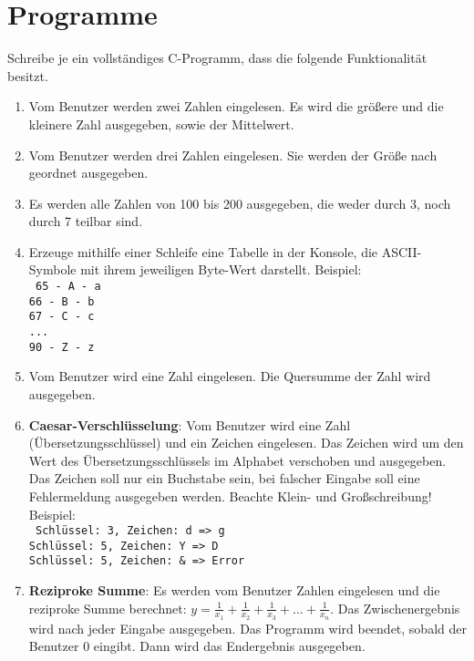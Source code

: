 \documentclass[]{scrartcl}
\begin{document}
\section{Programme}
Schreibe je ein vollständiges C-Programm, dass die folgende Funktionalität besitzt.
\begin{enumerate}[{1)}]
	\item Vom Benutzer werden zwei Zahlen eingelesen. Es wird die größere und die kleinere Zahl ausgegeben, sowie der Mittelwert.
	
	\item Vom Benutzer werden drei Zahlen eingelesen. Sie werden der Größe nach geordnet ausgegeben.
	
	\item Es werden alle Zahlen von 100 bis 200 ausgegeben, die weder durch 3, noch durch 7 teilbar sind.
	
	\item Erzeuge mithilfe einer Schleife eine Tabelle in der Konsole, die ASCII-Symbole mit ihrem jeweiligen Byte-Wert darstellt. Beispiel:\\
	\texttt{
		65 - A - a\\
		66 - B - b\\
		67 - C - c\\
		...\\
		90 - Z - z\\
	}

	\item Vom Benutzer wird eine Zahl eingelesen. Die Quersumme der Zahl wird ausgegeben.
	
	\item \textbf{Caesar-Verschlüsselung}: Vom Benutzer wird eine Zahl (Übersetzungsschlüssel) und ein Zeichen eingelesen. Das Zeichen wird um den Wert des Übersetzungsschlüssels im Alphabet verschoben und ausgegeben. Das Zeichen soll nur ein Buchstabe sein, bei falscher Eingabe soll eine Fehlermeldung ausgegeben werden. Beachte Klein- und Großschreibung! Beispiel:\\
	\texttt{
		Schlüssel: 3, Zeichen: d => g\\
		Schlüssel: 5, Zeichen: Y => D\\
		Schlüssel: 5, Zeichen: \& => Error
	}

	\item \textbf{Reziproke Summe}: Es werden vom Benutzer Zahlen eingelesen und die reziproke Summe berechnet: $y = \frac{1}{x_1} + \frac{1}{x_2} + \frac{1}{x_3} + \ldots + \frac{1}{x_n}$. Das Zwischenergebnis wird nach jeder Eingabe ausgegeben. Das Programm wird beendet, sobald der Benutzer 0 eingibt. Dann wird das Endergebnis ausgegeben.
	

\end{enumerate}
\end{document}
